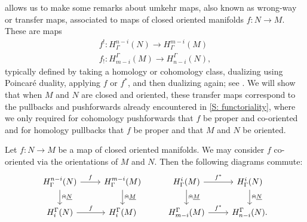  allows us to make some remarks about umkehr maps, also known as wrong-way or transfer maps, associated to maps of closed oriented manifolds $f \colon N \to M$.
These are maps
\begin{align*}
	f^! \colon H^{n-i}_\Gamma(N) \to H^{m-i}_\Gamma(M)\\
	f_! \colon H_{m-i}^\Gamma(M) \to H_{n-i}^\Gamma(N),
\end{align*}
typically defined by taking a homology or cohomology class, dualizing using Poincar\'e duality, applying $f$ or $f^*$, and then dualizing again; see \cite[Definition VI.11.2]{Bred97}.
We will show that when $M$ and $N$ are closed and oriented, these transfer maps correspond to the pullbacks and pushforwards already encountered in \cref{S: functoriality}, where we only required for cohomology pushforwards that $f$ be proper and co-oriented and for homology pullbacks that $f$ be proper and that $M$ and $N$ be oriented.

\begin{proposition}
	Let $f \colon N \to M$ be a map of closed oriented manifolds.
	We may consider $f$ co-oriented via the orientations of $M$ and $N$.
	Then the following diagrams commute:
	\[
	\begin{tikzcd}
		H^{n-i}_\Gamma(N) \arrow{r}{f} \arrow[d, "\nplus \uN"] & H^{m-i}_\Gamma(M) \arrow[d, "\nplus \uM"] & H^{i}_\Gamma(M) \arrow{r}{f^*} \arrow[d, "\nplus \uM"] & H^{i}_\Gamma(N) \arrow[d, "\nplus \uN"] \\
		H_i^\Gamma(N) \arrow{r}{f} & H_i^\Gamma(M) & H_{m-i}^\Gamma(M) \arrow{r}{f^*} & H_{n-i}^\Gamma(N).
	\end{tikzcd}
	\]
\end{proposition}

